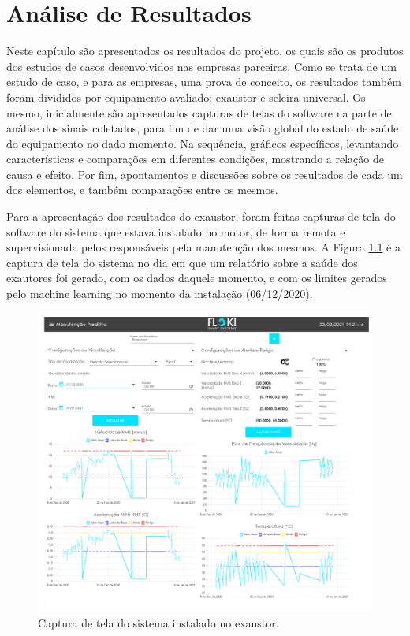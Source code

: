 
\chapter{Análise de Resultados}

Neste capítulo são apresentados os resultados do projeto, os quais são os produtos dos estudos de casos desenvolvidos nas empresas parceiras.
Como se trata de um estudo de caso, e para as empresas, uma prova de conceito, os resultados também foram divididos por equipamento avaliado:
exaustor e seleira universal. Os mesmo, inicialmente são apresentados capturas de telas do software na parte de análise dos sinais coletados, para fim
de dar uma visão global do estado de saúde do equipamento no dado momento. Na sequência, gráficos específicos, levantando características e 
comparações em diferentes condições, mostrando a relação de causa e efeito. Por fim, apontamentos e discussões sobre os resultados de cada um
dos elementos, e também comparações entre os mesmos.

Para a apresentação dos resultados do exaustor, foram feitas capturas de tela do software do sistema que estava instalado no motor, de forma
remota e supervisionada pelos responsáveis pela manutenção dos mesmos. A Figura \ref{fig:exaustor_1} é a captura de tela do sistema no dia
em que um relatório sobre a saúde dos exautores foi gerado, com os dados daquele momento, e com os limites gerados pelo machine learning
no momento da instalação (06/12/2020).

\begin{figure}[H]
    \caption{Captura de tela do sistema instalado no exaustor.}
    \begin{center}
        \includegraphics[scale=0.95, page=1]{resultados/img/resultados.pdf}
    \end{center}
    \label{fig:exaustor_1}
\end{figure}

